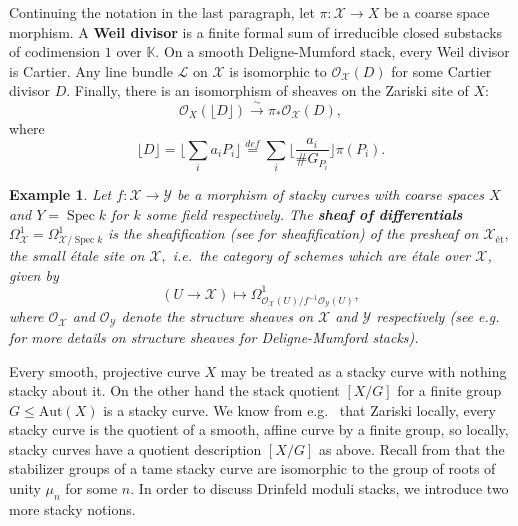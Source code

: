 \documentclass[11pt]{amsart}
\newtheorem{example}[theorem]{Example}
\theoremstyle{definition}
\numberwithin{equation}{section}
\newcommand{\Aut}{\mathrm{Aut}} 	%
\newcommand{\Spec}{\operatorname{Spec}} 	%
\newcommand{\cO}{\mathcal{O}}		%
\newcommand{\sL}{\mathscr{L}}		%
\newcommand{\sX}{\mathscr{X}}		%
\newcommand{\sY}{\mathscr{Y}}		%
\newcommand{\bbK}{\mathbb{K}}		%
\begin{document}
		Continuing the notation in the last paragraph, let $\pi:\sX\to X$ be a coarse space morphism. A \textbf{Weil divisor} is a finite formal sum of irreducible closed substacks of codimension $1$ over $\bbK.$ On a smooth Deligne-Mumford stack, every Weil divisor is Cartier. Any line bundle $\sL$ on $\sX$ is isomorphic to $\cO_{\sX}(D)$ for some Cartier divisor $D.$ Finally, there is an isomorphism of sheaves on the Zariski site of $X:$
		\[ \cO_X(\lfloor D \rfloor)\overset{\sim}{\to}\pi_*\cO_{\sX}(D), \]
		where \[\lfloor D\rfloor=\Big\lfloor\sum_ia_iP_i\Big\rfloor\overset{def}{=}\sum_i\Big\lfloor\frac{a_i}{\#G_{P_i}}\Big\rfloor\pi(P_i).\]
		
		\begin{example}\label{ex: sheaf of differentials}
			Let $f:\sX\to \sY$ be a morphism of stacky curves with coarse spaces $X$ and $Y=\Spec k$ for $k$ some field respectively. The \textbf{sheaf of differentials} $\Omega^1_{\sX}=\Omega^1_{\sX/\Spec k}$ is the sheafification (see \cite[Section $2.2.9$]{Alper-Stacks-and-Moduli} for sheafification) of the presheaf on $\sX_{\text{\'et}},$ the small \'etale site on $\sX,$ i.e.\ the category of schemes which are \'etale over $\sX$, given by 
			\[ (U\to \sX)\mapsto \Omega^1_{\cO_{\sX}(U)/f^{-1}\cO_{\sY}(U)},\]
			where $\cO_{\sX}$ and $\cO_{\sY}$ denote the structure sheaves on $\sX$ and $\sY$ respectively (see e.g.\ \cite[Example $4.1.2$]{Alper-Stacks-and-Moduli} for more details on structure sheaves for Deligne-Mumford stacks). 
		\end{example}
		
		Every smooth, projective curve $X$ may be treated as a stacky curve with nothing stacky about it. On the other hand the stack quotient $[X/G]$ for a finite group $G\leq \Aut(X)$ is a stacky curve. We know from e.g.\ \cite[Remark $5.2.8$]{VZB} that Zariski locally, every stacky curve is the quotient of a smooth, affine curve by a finite group, so locally, stacky curves have a quotient description $[X/G]$ as above. Recall from \cite[Lemma $5.3.10.(b)$]{VZB} that the stabilizer groups of a tame stacky curve are isomorphic to the group of roots of unity $\mu_n$ for some $n.$ In order to discuss Drinfeld moduli stacks, we introduce two more stacky notions.\\
		
\end{document}
